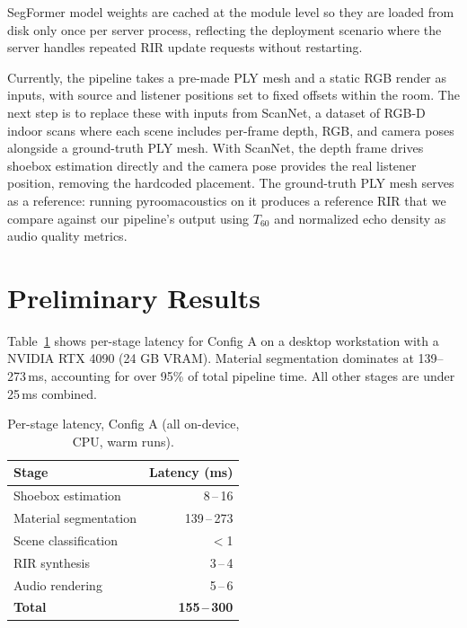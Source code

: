 \documentclass[11pt]{article}
\begin{document}
SegFormer model weights are cached at the module level so they are loaded from
disk only once per server process, reflecting the deployment scenario where the
server handles repeated RIR update requests without restarting.

Currently, the pipeline takes a pre-made PLY mesh and a static RGB render as
inputs, with source and listener positions set to fixed offsets within the room.
The next step is to replace these with inputs from ScanNet, a dataset of
RGB-D indoor scans where each scene includes per-frame depth, RGB, and camera
poses alongside a ground-truth PLY mesh. With ScanNet, the depth frame drives
shoebox estimation directly and the camera pose provides the real listener
position, removing the hardcoded placement. The ground-truth PLY mesh serves
as a reference: running pyroomacoustics on it produces a reference RIR that
we compare against our pipeline's output using $T_{60}$ and normalized echo
density as audio quality metrics.

\section{Preliminary Results}

Table~\ref{tab:results} shows per-stage  latency for Config A on a desktop workstation with a NVIDIA RTX 4090 (24 GB VRAM). Material segmentation dominates at 139--273\,ms,
accounting for over 95\% of total pipeline time. All other stages are under
25\,ms combined.

\begin{table}[H]
\small\centering
\caption{Per-stage latency, Config A (all on-device, CPU, warm runs).}
\label{tab:results}
\begin{tabular}{@{}lr@{}}
\toprule
\textbf{Stage} & \textbf{Latency (ms)}\\
\midrule
Shoebox estimation     & 8\,--\,16\\
Material segmentation  & 139\,--\,273\\
Scene classification   & $<$1\\
RIR synthesis          & 3\,--\,4\\
Audio rendering        & 5\,--\,6\\
\midrule
\textbf{Total}         & \textbf{155\,--\,300}\\
\bottomrule
\end{tabular}
\end{table}
\end{document}

